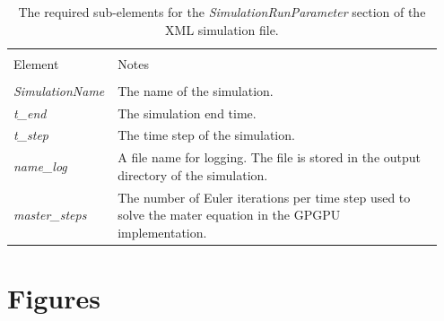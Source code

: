\documentclass[utf8]{frontiersSCNS} %
\begin{document}
\begin{table}[ht!]
\caption{The required sub-elements for the \textit{SimulationRunParameter} section of the XML simulation file.}
    \centering
    \begin{tabular}{|p{0.2\linewidth} | p{0.75\linewidth}|}
    \hline
     &\\
    Element & Notes \\
    \hline
     &\\
    \textit{SimulationName} & The name of the simulation.\\
    \textit{t\_end} & The simulation end time.\\
    \textit{t\_step} & The time step of the simulation.\\
    \textit{name\_log} & A file name for logging. The file is stored in the output directory of the simulation.\\
	\textit{master\_steps} & The number of Euler iterations per time step used to solve the mater equation in the GPGPU implementation. \\
    \hline
    \end{tabular}
\label{tab:simulationparameters}
\end{table}

\clearpage

\section*{Figures}

\end{document}
